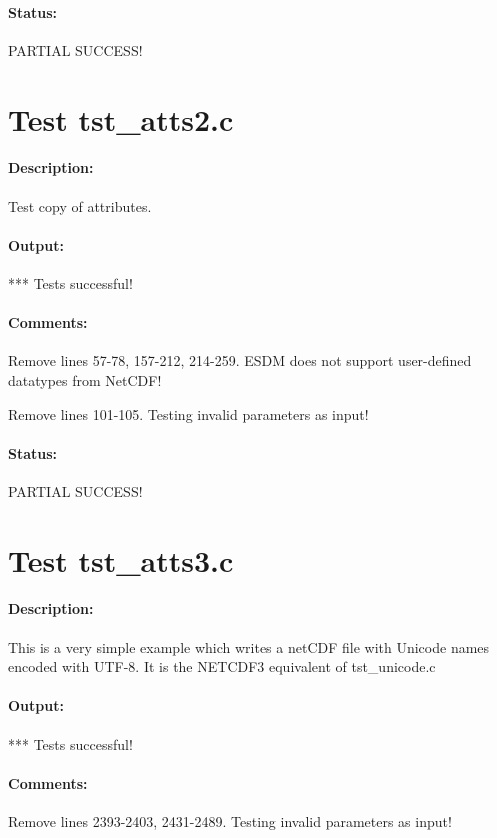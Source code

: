 \paragraph{Status:} PARTIAL SUCCESS!

\section{Test tst\_atts2.c}

\paragraph{Description:} Test copy of attributes.

\paragraph{Output:} *** Tests successful!

\paragraph{Comments:} Remove lines 57-78, 157-212, 214-259. ESDM does not support user-defined datatypes from NetCDF!

Remove lines 101-105. Testing invalid parameters as input!

\paragraph{Status:} PARTIAL SUCCESS!

\section{Test tst\_atts3.c}

\paragraph{Description:} This is a very simple example which writes a netCDF file with
Unicode names encoded with UTF-8. It is the NETCDF3 equivalent
of tst\_unicode.c

\paragraph{Output:} *** Tests successful!

\paragraph{Comments:} Remove lines 2393-2403, 2431-2489. Testing invalid parameters as input!

